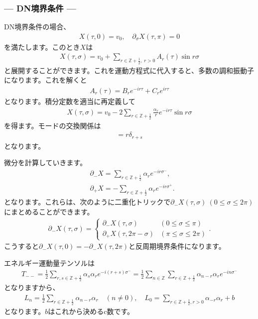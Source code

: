 \documentclass[report,paper=a4, fontsize=12pt, line_length=16cm, number_of_lines=34,dvipdfmx]{jlreq}
\numberwithin{equation}{chapter}
\numberwithin{equation}{section}
\newcommand{\Zb}{\mathbb{Z}}
\newcommand{\del}{\partial}
\newcommand{\Zbh}{\Zb+\frac12}
\begin{document}
\subsubsection*{--- DN境界条件 ---}
DN境界条件の場合、
\begin{align}
  X(\tau,0)=v_0,\quad \del_{\sigma}X(\tau,\pi)=0
\end{align}
を満たします。このとき$X$は
\begin{align}
  X(\tau,\sigma)=v_0+\sum_{r\in \Zbh,\ r>0}A_{r}(\tau)\sin r\sigma
\end{align}
と展開することができます。これを運動方程式に代入すると、多数の調和振動子になります。これを解くと
\begin{align}
  A_{r}(\tau)=B_{r}e^{-ir\tau}+C_{r}e^{ir\tau}
\end{align}
となります。積分定数を適当に再定義して
\begin{align}
  X(\tau,\sigma)=v_{0}-2\sum_{r\in \Zbh}\frac{\alpha_{r}}{r}e^{-ir\tau}\sin r\sigma
\end{align}
を得ます。モードの交換関係は
\begin{align}
  [\alpha_{r},\alpha_{s}]=r\delta_{r+s}
\end{align}
となります。

微分を計算していきます。
\begin{align}
  &\del_{-}X=\sum_{r\in \Zbh}\alpha_{r}e^{-ir\sigma^{-}},\\
  &\del_{+}X=-\sum_{r\in \Zbh}\alpha_{r}e^{-ir\sigma^{+}}.
\end{align}
となります。これらは、次のように二重化トリックで$\del_{-}X(\tau,\sigma)\ (0\le \sigma \le 2\pi)$にまとめることができます。
\begin{align}
  \del_{-}X(\tau,\sigma)=
  \begin{cases}
    \del_{-}X(\tau,\sigma)& (0\le \sigma \le \pi)\\
    \del_{+}X(\tau,2\pi-\sigma) & (\pi\le \sigma \le 2\pi)
  \end{cases}.
\end{align}
こうすると$\del_{-}X(\tau,0)=-\del_{-}X(\tau,2\pi)$と反周期境界条件になります。

エネルギー運動量テンソルは
\begin{align}
  T_{--}
  =\frac12 \sum_{r,s\in \Zbh}\alpha_{s}\alpha_{r} e^{-i(r+s)\sigma^{-}}
  =\frac12 \sum_{n\in\Zb}\sum_{r\in \Zbh}\alpha_{n-r}\alpha_{r} e^{-in\sigma^{-}}
\end{align}
となりますから、
\begin{align}
  L_{n}=\frac12 \sum_{r\in \Zbh}
  \alpha_{n-r}\alpha_{r}\quad (n\ne 0),\quad
  L_{0}=\sum_{r\in \Zbh,r>0}\alpha_{-r}\alpha_{r}+b
\end{align}
となります。$b$はこれから決めるc数です。
\end{document}
